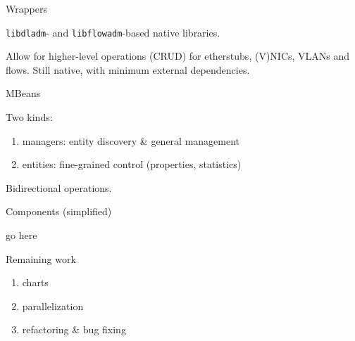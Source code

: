 \documentclass{beamer}
\begin{document}
	\begin{frame}{Wrappers}

		\texttt{libdladm}- and \texttt{libflowadm}-based native libraries.

		\medskip

		Allow for higher-level operations (CRUD) for etherstubs, (V)NICs, VLANs and flows. Still native, with minimum external dependencies.
	
	\end{frame}


	\begin{frame}{MBeans}

		Two kinds:
		
		\begin{enumerate}
			\item managers: entity discovery \& general management
			\item entities: fine-grained control (properties, statistics)
		\end{enumerate}

		Bidirectional operations.
	
	\end{frame}


	\begin{frame}{Components (simplified)}

		go here
	
	\end{frame}


	\begin{frame}{Remaining work}

		\begin{enumerate}
			\item charts
			\item parallelization
			\item refactoring \& bug fixing
		\end{enumerate}
	
	\end{frame}
\end{document}
